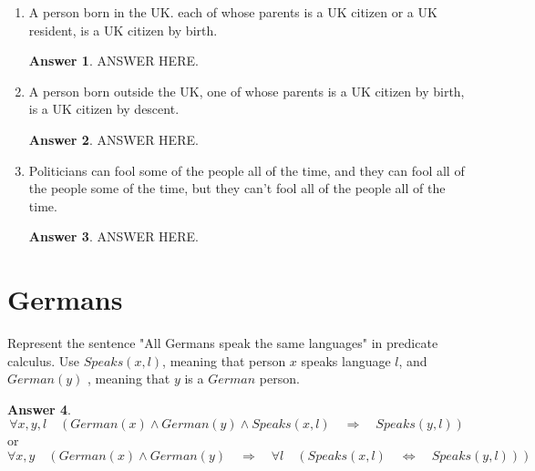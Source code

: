 \documentclass[a4paper]{article}
\renewcommand{\(}{\left(}
\renewcommand{\)}{\right)}
\theoremstyle{plain}
\theoremstyle{plain}
\theoremstyle{definition}
\newtheorem*{answer}{Answer}
\begin{document}
\begin{enumerate}[label*=\alph*.,ref=\alph*]
\item A person born in the UK. each of whose parents is a UK citizen or a UK resident, is a UK citizen by birth.
\begin{shaded}
\begin{answer}
ANSWER HERE.
\end{answer}
\end{shaded}

\item A person born outside the UK, one of whose parents is a UK citizen by birth, is a UK citizen by descent.
\begin{shaded}
\begin{answer}
ANSWER HERE.
\end{answer}
\end{shaded}

\item Politicians can fool some of the people all of the time, and they can fool all of the people some of the time, but they can't fool all of the people all of the time.
\begin{shaded}
\begin{answer}
ANSWER HERE.
\end{answer}
\end{shaded}


\end{enumerate}
\section{Germans}
 Represent the sentence "All Germans speak the same
languages" in predicate calculus. Use $Speaks(x,l)$, meaning that person $x$ speaks
language $l$, and $German(y)$ , meaning that $y$ is a $German$ person.
\begin{shaded}
\begin{answer}
\begin{equation*}
  \forall x , y , l \quad \left(German(x) \wedge German(y) \wedge Speaks (x,l) \quad \Rightarrow \quad Speaks(y,l) \right)
\end{equation*}
or
\begin{equation*}
  \forall x , y \quad \left(German(x) \wedge German(y)   \quad \Rightarrow \quad \forall l \quad (Speaks (x,l) \quad \Leftrightarrow \quad Speaks(y,l)) \right)
\end{equation*}

\end{answer}
\end{shaded}
\end{document}
